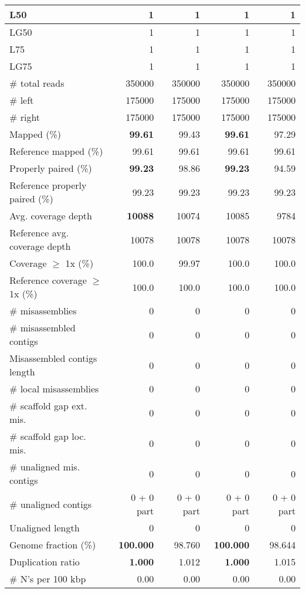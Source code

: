 \documentclass[12pt,a4paper]{article}
\begin{document}
\begin{table}[ht]
\begin{center}
\begin{tabular}{|l*{4}{|r}|}
L50 & 1 & 1 & 1 & 1 \\ \hline
LG50 & 1 & 1 & 1 & 1 \\ \hline
L75 & 1 & 1 & 1 & 1 \\ \hline
LG75 & 1 & 1 & 1 & 1 \\ \hline
\# total reads & 350000 & 350000 & 350000 & 350000 \\ \hline
\# left & 175000 & 175000 & 175000 & 175000 \\ \hline
\# right & 175000 & 175000 & 175000 & 175000 \\ \hline
Mapped (\%) & {\bf 99.61} & 99.43 & {\bf 99.61} & 97.29 \\ \hline
Reference mapped (\%) & 99.61 & 99.61 & 99.61 & 99.61 \\ \hline
Properly paired (\%) & {\bf 99.23} & 98.86 & {\bf 99.23} & 94.59 \\ \hline
Reference properly paired (\%) & 99.23 & 99.23 & 99.23 & 99.23 \\ \hline
Avg. coverage depth & {\bf 10088} & 10074 & 10085 & 9784 \\ \hline
Reference avg. coverage depth & 10078 & 10078 & 10078 & 10078 \\ \hline
Coverage $\geq$ 1x (\%) & 100.0 & 99.97 & 100.0 & 100.0 \\ \hline
Reference coverage $\geq$ 1x (\%) & 100.0 & 100.0 & 100.0 & 100.0 \\ \hline
\# misassemblies & 0 & 0 & 0 & 0 \\ \hline
\# misassembled contigs & 0 & 0 & 0 & 0 \\ \hline
Misassembled contigs length & 0 & 0 & 0 & 0 \\ \hline
\# local misassemblies & 0 & 0 & 0 & 0 \\ \hline
\# scaffold gap ext. mis. & 0 & 0 & 0 & 0 \\ \hline
\# scaffold gap loc. mis. & 0 & 0 & 0 & 0 \\ \hline
\# unaligned mis. contigs & 0 & 0 & 0 & 0 \\ \hline
\# unaligned contigs & 0 + 0 part & 0 + 0 part & 0 + 0 part & 0 + 0 part \\ \hline
Unaligned length & 0 & 0 & 0 & 0 \\ \hline
Genome fraction (\%) & {\bf 100.000} & 98.760 & {\bf 100.000} & 98.644 \\ \hline
Duplication ratio & {\bf 1.000} & 1.012 & {\bf 1.000} & 1.015 \\ \hline
\# N's per 100 kbp & 0.00 & 0.00 & 0.00 & 0.00 \\ \hline

\end{tabular}
\end{center}
\end{table}
\end{document}
